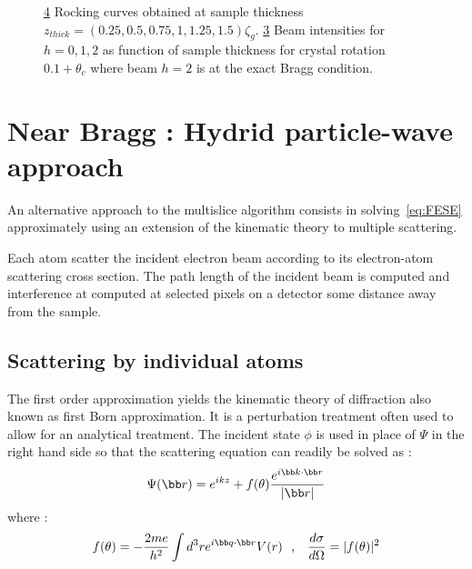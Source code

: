\documentclass[a4paper,10pt]{article}
\begin{document}
\begin{figure}[h!]
	\begin{subfigure}{\textwidth}
		\centering
		\begin{subfigure}{0.45\textwidth}
			\centering
      \def\svgwidth{\columnwidth}
			
			\caption{}\label{fig:2_beam_rocking}
		\end{subfigure}
		\begin{subfigure}{0.45\textwidth}
			\centering
      \def\svgwidth{\columnwidth}
			
			\caption{}\label{fig:2_beam_Itheta_c}
		\end{subfigure}
  \end{subfigure}
	\caption[2-beam extinction]{
		\ref{fig:2_beam_rocking} Rocking curves obtained at sample thickness $z_{thick}=\left(0.25,0.5,0.75,1,1.25,1.5\right)\zeta_g$.
		\ref{fig:2_beam_Itheta_c} Beam intensities for $h=0,1,2$ as function of sample thickness for crystal rotation $0.1+\theta_c$ where beam $h=2$ is at the exact Bragg condition.
	}\label{fig:2_beam_rocking}
\end{figure}





\newpage
\section{Near Bragg : Hydrid particle-wave approach}
An alternative approach to the multislice algorithm consists in solving~\eqref{eq:FESE} approximately using an extension of the kinematic theory to multiple scattering.

Each atom scatter the incident electron beam according to its electron-atom scattering cross section. The path length of the incident beam is computed and interference at computed at selected pixels on a detector some distance away from the sample.

\subsection{Scattering by individual atoms}
The first order approximation yields the kinematic theory of diffraction also known as first Born approximation. It is a perturbation treatment often used to allow for an analytical treatment. The incident state $\phi$ is used in place of $\Psi$ in the right hand side so that the scattering equation can readily be solved as :
\begin{equation}
    \Psi(\bb r)=e^{ikz} + f(\theta)\frac{e^{i\bb k\cdot\bb r}}{|\bb r|}
\end{equation}
where :
\begin{equation}
    f(\theta) = -\frac{2me}{h^2}\int d^3re^{i\bb q\cdot\bb r}V(r)
~~\mbox{,     }~~
    \frac{d\sigma}{d\Omega} = |f(\theta)|^2
\end{equation}
\end{document}
